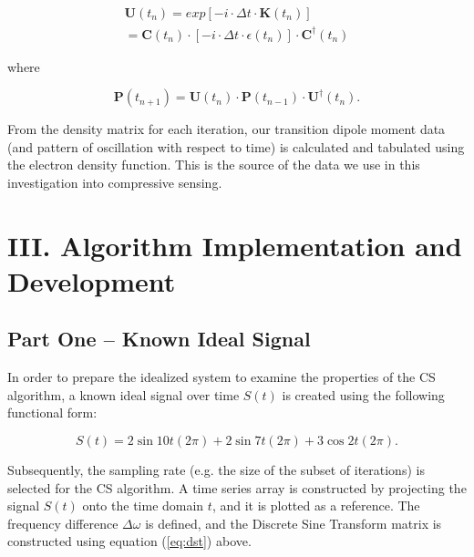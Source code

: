 \documentclass[11pt]{article}
\begin{document}
\begin{equation}\label{eq:prop}
\begin{split}
	\mathbf{U}(t_{n}) = exp[-i \cdot\Delta t \cdot \mathbf{K}(t_{n})]\\
	=\mathbf{C}(t_{n})\cdot[-i\cdot\Delta t \cdot \epsilon (t_{n})]\cdot \mathbf{C}^{\dag}(t_{n})
\end{split}
\end{equation}

where

\begin{equation}\label{eq:evol}
	\mathbf{P}(t_{n+1}) = \mathbf{U}(t_{n})\cdot\mathbf{P}(t_{n-1})\cdot\mathbf{U}^{\dag}(t_{n}).
\end{equation}

\par From the density matrix for each iteration, our transition dipole moment data (and pattern of oscillation with respect to time) is calculated and tabulated using the electron density function.  This is the source of the data we use in this investigation into compressive sensing.


\section*{III.	Algorithm Implementation and Development}
\subsection*{Part One -- Known Ideal Signal}
In order to prepare the idealized system to examine the properties of the CS algorithm, a known ideal signal over time $S(t)$ is created using the following functional form:

\begin{equation}\label{eq:ideal}
	S(t) = 2\sin{10t(2\pi)}+2\sin{7t(2\pi)} + 3\cos{2t(2\pi)}.
\end{equation}

\par Subsequently, the sampling rate (e.g. the size of the subset of iterations) is selected for the CS algorithm. A time series array is constructed by projecting the signal $S(t)$ onto the time domain $t$, and it is plotted as a reference.  The frequency difference $\Delta\omega$ is defined, and the Discrete Sine Transform matrix is constructed using equation (\ref{eq:dst}) above.  
\end{document}
